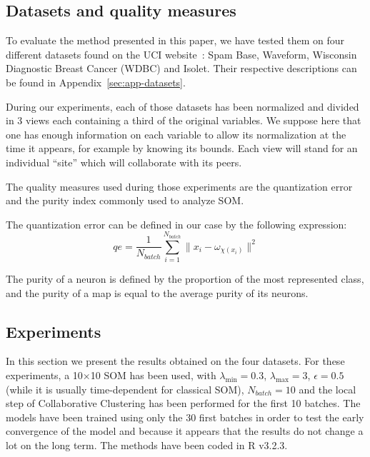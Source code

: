 	\subsection{Datasets and quality measures}
    To evaluate the method presented in this paper, we have tested them on four different datasets found on the UCI website~\cite{uci}: Spam Base, Waveform, Wisconsin Diagnostic Breast Cancer (WDBC) and Isolet. Their respective descriptions can be found in Appendix~\ref{sec:app-datasets}.

	During our experiments, each of those datasets has been normalized and divided in 3 views each containing a third of the original variables. We suppose here that one has enough information on each variable to allow its normalization at the time it appears, for example by knowing its bounds. Each view will stand for an individual ``site'' which will collaborate with its peers.
	
	The quality measures used during those experiments are the quantization error and the purity index commonly used to analyze SOM.\@
	
	The quantization error can be defined in our case by the following expression:
	\begin{equation}
	qe = \frac{1}{N_{batch}}\sum_{i=1}^{N_{batch}}\|x_i - \omega_{\chi(x_i)}\|^2
	\end{equation}
	
	The purity of a neuron is defined by the proportion of the most represented class, and the purity of a map is equal to the average purity of its neurons. 
		
	\subsection{Experiments}
	In this section we present the results obtained on the four datasets. For these experiments, a 10$\times$10 SOM has been used, with $\lambda_{\min}=0.3$, $\lambda_{\max}=3$, $\epsilon=0.5$ (while it is usually time-dependent for classical SOM), $N_{batch}=10$ and the local step of Collaborative Clustering has been performed for the first 10 batches. The models have been trained using only the 30 first batches in order to test the early convergence of the model and because it appears that the results do not change a lot on the long term. The methods have been coded in R v3.2.3.
	
